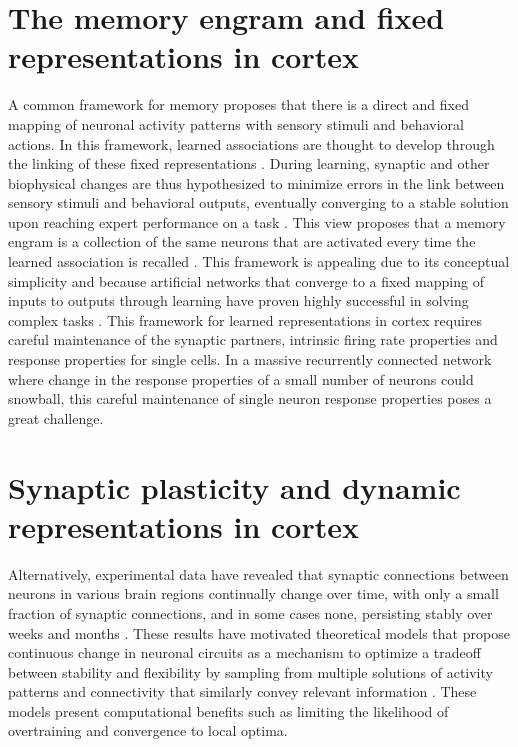 \section{The memory engram and fixed representations in cortex} 
A common framework for memory proposes that there is a direct and fixed mapping of neuronal activity patterns with sensory stimuli and behavioral actions. In this framework, learned associations are thought to develop through the linking of these fixed representations \citep{Messinger2001, Sakai1991, Veit2015}. During learning, synaptic and other biophysical changes are thus hypothesized to minimize errors in the link between sensory stimuli and behavioral outputs, eventually converging to a stable solution upon reaching expert performance on a task \citep{Ganguly2009, Peters2014, Chestek2007}. This view proposes that a memory engram is a collection of the same neurons that are activated every time the learned association is recalled \citep{Tonegawa2015}. This framework is appealing due to its conceptual simplicity and because artificial networks that converge to a fixed mapping of inputs to outputs through learning have proven highly successful in solving complex tasks \citep{Abbott2009, Buonomano2005, LeCun2015}. This framework for learned representations in cortex requires careful maintenance of the synaptic partners, intrinsic firing rate properties and response properties for single cells. In a massive recurrently connected network where change in the response properties of a small number of neurons could snowball, this careful maintenance of single neuron response properties poses a great challenge.

\section{Synaptic plasticity and dynamic representations in cortex} 
Alternatively, experimental data have revealed that synaptic connections between neurons in various brain regions continually change over time, with only a small fraction of synaptic connections, and in some cases none, persisting stably over weeks and months \citep{Attardo2015, Stettler2006, Trachtenberg2002}. These results have motivated theoretical models that propose continuous change in neuronal circuits as a mechanism to optimize a tradeoff between stability and flexibility by sampling from multiple solutions of activity patterns and connectivity that similarly convey relevant information \citep{Ajemian2013, Kappel2015, Rokni2007a}. These models present computational benefits such as limiting the likelihood of overtraining and convergence to local optima.

